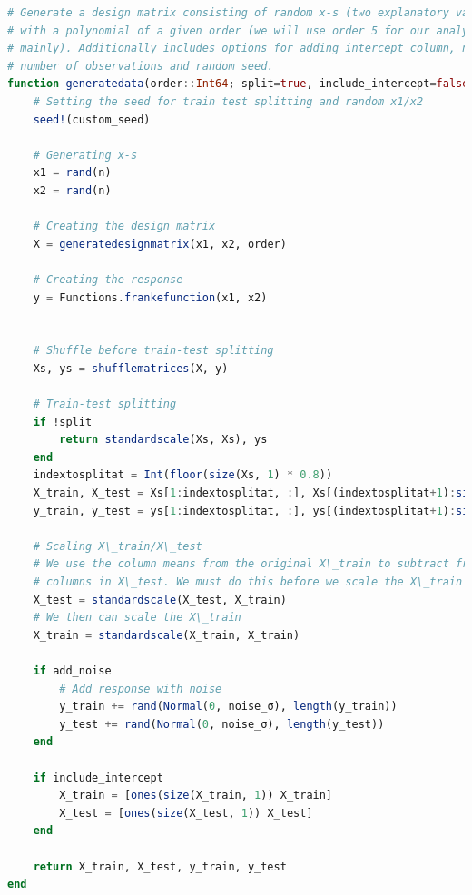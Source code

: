 \documentclass{article}
\begin{document}
\begin{lstlisting}[language=julia]
# Generate a design matrix consisting of random x-s (two explanatory variables)
# with a polynomial of a given order (we will use order 5 for our analysis
# mainly). Additionally includes options for adding intercept column, noise,
# number of observations and random seed.
function generatedata(order::Int64; split=true, include_intercept=false, add_noise=false, noise_σ=0.1, n=200, custom_seed=1000)
    # Setting the seed for train test splitting and random x1/x2
    seed!(custom_seed)

    # Generating x-s
    x1 = rand(n)
    x2 = rand(n)

    # Creating the design matrix
    X = generatedesignmatrix(x1, x2, order)

    # Creating the response
    y = Functions.frankefunction(x1, x2)


    # Shuffle before train-test splitting
    Xs, ys = shufflematrices(X, y)

    # Train-test splitting
    if !split
        return standardscale(Xs, Xs), ys
    end
    indextosplitat = Int(floor(size(Xs, 1) * 0.8))
    X_train, X_test = Xs[1:indextosplitat, :], Xs[(indextosplitat+1):size(Xs, 1), :]
    y_train, y_test = ys[1:indextosplitat, :], ys[(indextosplitat+1):size(ys, 1), :]

    # Scaling X\_train/X\_test
    # We use the column means from the original X\_train to subtract from the
    # columns in X\_test. We must do this before we scale the X\_train
    X_test = standardscale(X_test, X_train)
    # We then can scale the X\_train
    X_train = standardscale(X_train, X_train)

    if add_noise
        # Add response with noise
        y_train += rand(Normal(0, noise_σ), length(y_train))
        y_test += rand(Normal(0, noise_σ), length(y_test))
    end

    if include_intercept
        X_train = [ones(size(X_train, 1)) X_train]
        X_test = [ones(size(X_test, 1)) X_test]
    end

    return X_train, X_test, y_train, y_test
end
\end{lstlisting}
\end{document}
